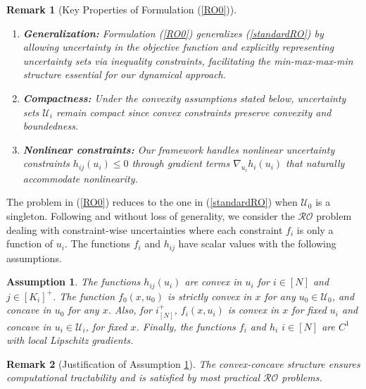 \documentclass[journal,twoside,web]{ieeecolor}
\newcommand{\rev}[1]{\textcolor{revisionblue}{#1}}
\newtheorem{assumption}[theorem]{Assumption}
\newtheorem{remark}{Remark}
\begin{document}
\begin{remark}[\rev{Key Properties of Formulation (\ref{RO0})}]
\begin{enumerate}
\item \rev{\textbf{Generalization:} Formulation (\ref{RO0}) generalizes (\ref{standardRO}) by allowing uncertainty in the objective function and explicitly representing uncertainty sets via inequality constraints, facilitating the min-max-max-min structure essential for our dynamical approach.}
\item \rev{\textbf{Compactness:} Under the convexity assumptions stated below, uncertainty sets $\mathcal{U}_i$ remain compact since convex constraints preserve convexity and boundedness.}
\item \rev{\textbf{Nonlinear constraints:} Our framework handles nonlinear uncertainty constraints $h_{ij}(u_i) \leq 0$ through gradient terms $\nabla_{u_i} h_i(u_i)$ that naturally accommodate nonlinearity.}
\end{enumerate}
\end{remark}

The problem in (\ref{RO0}) reduces to the one in (\ref{standardRO}) when $\mathcal{U}_0$ is a singleton.
Following \cite{bental2009-2} and without loss of generality, we consider the $\mathcal{RO}$ problem dealing with constraint-wise uncertainties where each constraint $f_i$ is only a function of $u_i$.
The functions $f_i$ and $h_{ij}$ have scalar values with the following assumptions.

\begin{assumption}\label{assume1} The functions $h_{ij}(u_i)$ are convex in $u_i$ for $i\in[N]$ and $j\in[K_i]^+$.
The function $f_0(x,u_0)$ is strictly convex in $x$ for any $u_0\in \mathcal{U}_0$, and concave in $u_0$ for any $x$. Also, for $i^+_{[N]}$, $f_i(x,u_i)$ is convex in $x$ for fixed $u_i$ and concave in $u_i\in \mathcal{U}_i$, for fixed $x$.
Finally, the functions $f_i$ and $h_i$ $i\in[N]$ are $C^1$ with local Lipschitz gradients.
\end{assumption}

\begin{remark}[\rev{Justification of Assumption \ref{assume1}}]
\rev{The convex-concave structure ensures computational tractability and is satisfied by most practical $\mathcal{RO}$ problems.}
\end{remark}
\end{document}
